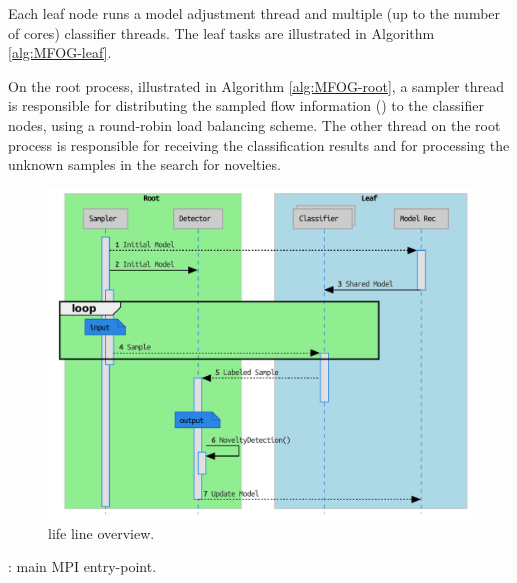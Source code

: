 Each leaf node runs a model adjustment thread and multiple (up to the number of
cores) classifier threads. The leaf tasks are illustrated in Algorithm
\ref{alg:MFOG-leaf}.

On the root process, illustrated in Algorithm \ref{alg:MFOG-root}, a sampler
thread is responsible for distributing the
sampled flow information (\val) to the classifier nodes, using a round-robin
load balancing scheme.
The other thread on the root process is responsible for receiving the
classification results and for processing the unknown samples in the search for
novelties.

\begin{figure}[h]
    \centering
    \includegraphics[width=\whencolumns{0.7\linewidth}{\columnwidth},page=1]{figures/lifecycle.uml.svg.pdf}
    \caption{\mfog life line overview.}
    \label{fig:mfog-mpi-life}
\end{figure}

\newlength{\intextsepBKP}
\setlength{\intextsepBKP}{\intextsep}
\setlength{\intextsep}{5pt}

\begin{algorithm}[h]
    
    \KwParams{\mpiRank}
\caption{\mfog: main MPI entry-point.}
\label{alg:MFOG}
\end{algorithm}

